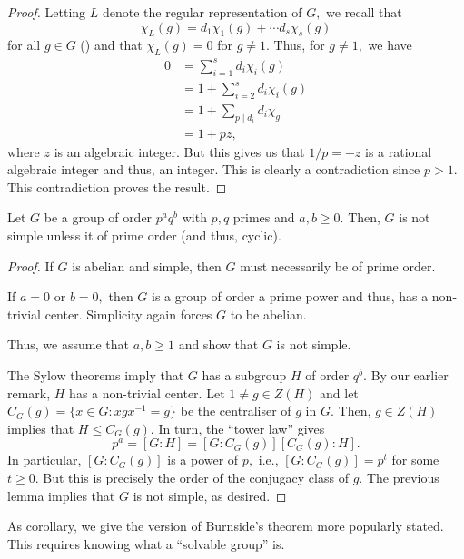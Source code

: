 \begin{proof}
	Letting $L$ denote the regular representation of $G,$ we recall that
	\begin{equation*} 
		\chi_L(g) = d_1\chi_1(g) + \cdots d_s\chi_s(g)
	\end{equation*}
	for all $g \in G$ () and that $\chi_L(g) = 0$ for $g \neq 1.$ Thus, for $g \neq 1,$ we have
	\begin{align*} 
		0 &= \sum_{i = 1}^{s}d_i\chi_i(g)\\
		&= 1 + \sum_{i = 2}^{s}d_i\chi_i(g)\\
		&= 1 + \sum_{p \mid d_i}d_i\chi_g\\
		&= 1 + pz,
	\end{align*}
	where $z$ is an algebraic integer. But this gives us that $1/p = -z$ is a rational algebraic integer and thus, an integer. This is clearly a contradiction since $p > 1.$ This contradiction proves the result.
\end{proof}

\begin{thm}[Burnside] \label{thm:burnsidepq}
	Let $G$ be a group of order $p^aq^b$ with $p, q$ primes and $a, b \ge 0.$ Then, $G$ is not simple unless it of prime order (and thus, cyclic).
\end{thm}
\begin{proof} 
	If $G$ is abelian and simple, then $G$ must necessarily be of prime order. 

	If $a = 0$ or $b = 0,$ then $G$ is a group of order a prime power and thus, has a non-trivial center. Simplicity again forces $G$ to be abelian. 

	Thus, we assume that $a, b \ge 1$ and show that $G$ is not simple.

	The Sylow theorems imply that $G$ has a subgroup $H$ of order $q^b.$ By our earlier remark, $H$ has a non-trivial center. Let $1 \neq g \in Z(H)$ and let $C_G(g) = \{x \in G : xgx^{-1} = g\}$ be the centraliser of $g$ in $G.$ Then, $g \in Z(H)$ implies that $H \le C_G(g).$ In turn, the ``tower law'' gives
	\begin{equation*} 
		p^a = [G:H] = [G:C_G(g)][C_G(g):H].
	\end{equation*}
	In particular, $[G:C_G(g)]$ is a power of $p,$ i.e., $[G:C_G(g)] = p^t$ for some $t \ge 0.$ But this is precisely the order of the conjugacy class of $g.$ The previous lemma implies that $G$ is not simple, as desired.
\end{proof}

As corollary, we give the version of Burnside's theorem more popularly stated. This requires knowing what a ``solvable group'' is.

